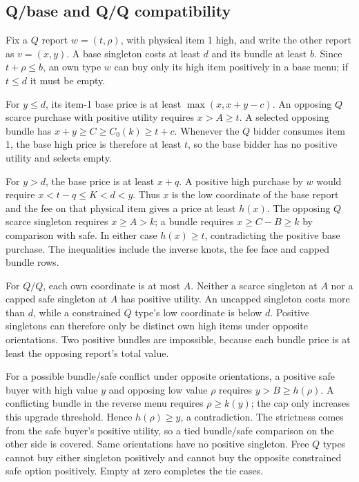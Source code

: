 \subsection{Q/base and Q/Q compatibility}
Fix a $Q$ report $w=(t,\rho)$, with physical item 1 high, and write the
other report as $v=(x,y)$. A base singleton costs at least $d$ and its bundle
at least $b$. Since $t+\rho\le b$, an own type $w$ can buy only its high
item positively in a base menu; if $t\le d$ it must be empty.

For $y\le d$, its item-1 base price is at least $\max(x,x+y-c)$.
An opposing $Q$ scarce purchase with positive utility requires $x>A\ge t$.
A selected opposing bundle has $x+y\ge C\ge C_0(k)\ge t+c$.
Whenever the $Q$ bidder consumes item 1, the base high price is therefore
at least $t$, so the base bidder has no positive utility and selects empty.

For $y>d$, the base price is at least $x+q$. A positive high purchase by
$w$ would require $x<t-q\le K<d<y$. Thus $x$ is the low coordinate of
the base report and the fee on that physical item gives a price at least
$h(x)$. The opposing $Q$ scarce singleton requires $x\ge A>k$;
a bundle requires $x\ge C-B\ge k$ by comparison with safe. In either
case $h(x)\ge t$, contradicting the positive base purchase. The inequalities
include the inverse knots, the fee face and capped bundle rows.

For $Q/Q$, each own coordinate is at most $A$. Neither a scarce singleton
at $A$ nor a capped safe singleton at $A$ has positive utility. An uncapped
singleton costs more than $d$, while a constrained $Q$ type's low coordinate
is below $d$. Positive singletons can therefore only be distinct own high
items under opposite orientations. Two positive bundles are impossible,
because each bundle price is at least the opposing report's total value.

For a possible bundle/safe conflict under opposite orientations, a positive
safe buyer with high value $y$ and opposing low value $\rho$ requires
$y>B\ge h(\rho)$. A conflicting bundle in the reverse menu requires
$\rho\ge k(y)$; the cap only increases this upgrade threshold. Hence
$h(\rho)\ge y$, a contradiction. The strictness comes from the safe
buyer's positive utility, so a tied bundle/safe comparison on the other
side is covered. Same orientations have no positive singleton. Free $Q$
types cannot buy either singleton positively and cannot buy the opposite
constrained safe option positively. Empty at zero completes the tie cases.


